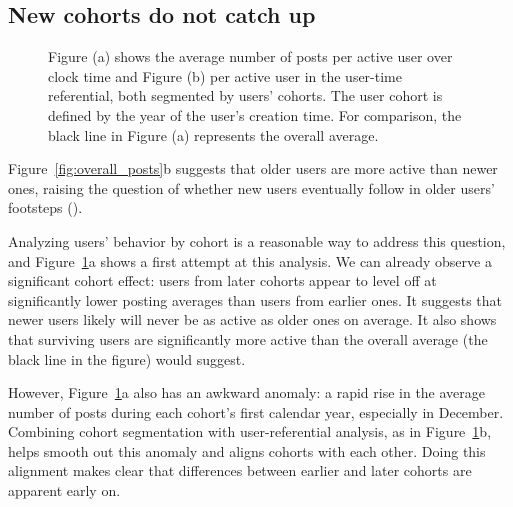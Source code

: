 \subsection{New cohorts do not catch up}

\begin{figure}[!tb]
\centering
{}
\caption{Figure (a) shows the average number of posts per active user over clock time and Figure (b) per active user in the user-time referential, both segmented by users' cohorts. The user cohort is defined by the year of the user's creation time.  For comparison, the black line in Figure (a) represents the overall average.}
\label{fig:avr_posts_per_user_over_time_cohorts}
\end{figure}

Figure~\ref{fig:overall_posts}b suggests that older users are more active than newer ones, raising the question of whether new users
eventually follow in older users' footsteps (\SubResearchQuestion\label{srq:newFollowOld}).  

Analyzing users' behavior by cohort is a reasonable way to address this question, and Figure~\ref{fig:avr_posts_per_user_over_time_cohorts}a shows a first attempt at this analysis.  We can already observe a significant cohort effect: users from later cohorts appear to level off at significantly lower posting averages than users from earlier ones.  It suggests that newer users likely will never be as active as older ones on average.  It also shows that surviving users are significantly more active than the overall average (the black line in the figure) would suggest.

However, Figure~\ref{fig:avr_posts_per_user_over_time_cohorts}a also has an awkward anomaly: a rapid rise in the average number of posts during each cohort's first calendar year, especially in December. Combining cohort segmentation with user-referential analysis, as in Figure~\ref{fig:avr_posts_per_user_over_time_cohorts}b, helps smooth out this anomaly and aligns cohorts with each other.  Doing this alignment makes clear that differences between earlier and later cohorts are apparent early on.

